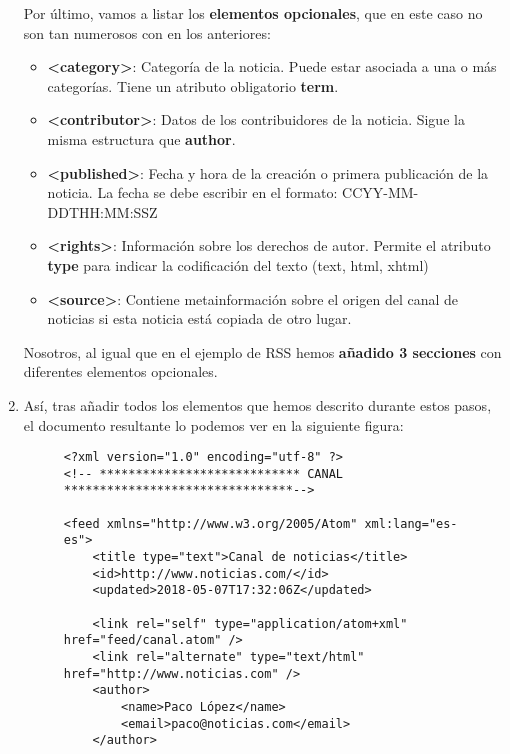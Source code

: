 \begin{enumerate}
    Por último, vamos a listar los \textbf{elementos opcionales}, que en este caso no son tan numerosos con en los anteriores:

    \begin{itemize}
        \item \textbf{<category>}: Categoría de la noticia. Puede estar asociada a una o más categorías. Tiene un atributo obligatorio \textbf{term}.
        \item \textbf{<contributor>}: Datos de los contribuidores de la noticia. Sigue la misma estructura que \textbf{author}.
        \item \textbf{<published>}: Fecha y hora de la creación o primera publicación de la noticia. La fecha se debe escribir en el formato: CCYY-MM-DDTHH:MM:SSZ
        \item \textbf{<rights>}: Información sobre los derechos de autor. Permite el atributo \textbf{type} para indicar la codificación del texto (text, html, xhtml)
        \item \textbf{<source>}: Contiene metainformación sobre el origen del canal de noticias si esta noticia está copiada de otro lugar.
    \end{itemize}

     Nosotros, al igual que en el ejemplo de RSS hemos \textbf{añadido 3 secciones} con diferentes elementos opcionales.

     \item Así, tras añadir todos los elementos que hemos descrito durante estos pasos, el documento resultante lo podemos ver en la siguiente figura:

     \begin{figure}[H]
         \begin{tcolorbox}[sharp corners, colback=yellow!30, colframe=white!20]
             \scriptsize
             \begin{verbatim}
<?xml version="1.0" encoding="utf-8" ?>
<!-- **************************** CANAL ********************************-->

<feed xmlns="http://www.w3.org/2005/Atom" xml:lang="es-es">
    <title type="text">Canal de noticias</title>
    <id>http://www.noticias.com/</id>
    <updated>2018-05-07T17:32:06Z</updated>

    <link rel="self" type="application/atom+xml" href="feed/canal.atom" />
    <link rel="alternate" type="text/html" href="http://www.noticias.com" />
    <author>
        <name>Paco López</name>
        <email>paco@noticias.com</email>
    </author>


\end{verbatim}
\end{tcolorbox}
\end{figure}
\end{enumerate}
